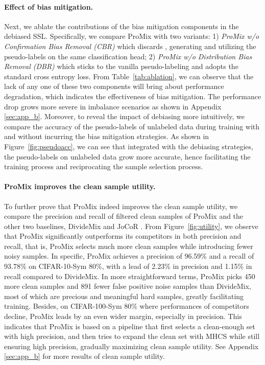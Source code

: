 \documentclass{article}
\begin{document}
\paragraph{Effect of bias mitigation.}
Next, we ablate the contributions of the bias mitigation components in the debiased SSL. Specifically, we compare ProMix with two variants: 1) \emph{ProMix w/o Confirmation Bias Removal (CBR)} which discards , generating and utilizing the pseudo-labels on the same classification head; 2) \emph{ProMix w/o Distribution Bias Removal (DBR)} which sticks to the vanilla pseudo-labeling and adopts the standard cross entropy loss. From Table~\ref{tab:ablation}, we can observe that the lack of any one of these two components will bring about performance degradation, which indicates the effectiveness of bias mitigation. The performance drop grows more severe in imbalance scenarios as shown in Appendix \ref{sec:app_b}. Moreover, to reveal the impact of debiasing more intuitively, we compare the accuracy of the pseudo-labels of unlabeled data during training with and without incurring the bias mitigation strategies. As shown in Figure~\ref{fig:pseudoacc}, we can see that integrated with the debiasing strategies, the pseudo-labels on unlabeled data grow more accurate, hence facilitating the training process and reciprocating the sample selection process.




\paragraph{ProMix improves the clean sample utility.} To further prove that ProMix indeed improves the clean sample utility, we compare the precision and recall of filtered clean samples of ProMix and the other two baselines, DivideMix \cite{DBLP:conf/iclr/LiSH20} and JoCoR \cite{DBLP:conf/cvpr/WeiFC020}. From Figure~\ref{fig:utility}, we observe that ProMix significantly outperforms its competitors in both precision and recall, that is, ProMix selects much more clean samples while introducing fewer noisy samples. In specific, ProMix achieves a precision of 96.59\% and a recall of 93.78\% on CIFAR-10-Sym 80\%, with a lead of 2.23\% in precision and 1.15\% in recall compared to DivideMix. In more straightforward terms, ProMix picks 450 more clean samples and 891 fewer false positive noise samples than DivideMix, most of which are precious and meaningful hard samples, greatly facilitating training. Besides, on CIFAR-100-Sym 80\% where performances of competitors decline, ProMix leads by an even wider margin, especially in precision. This indicates that ProMix is based on a pipeline that first selects a clean-enough set with high precision, and then tries to expand the clean set with MHCS while still ensuring high precision, gradually maximizing clean sample utility. See Appendix \ref{sec:app_b} for more results of clean sample utility. 
\end{document}

